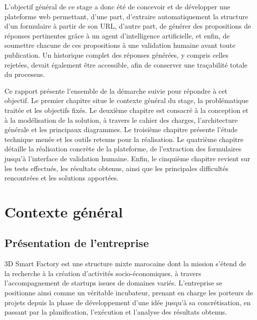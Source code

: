 \documentclass[12pt,a4paper]{report}
\begin{document}
L'objectif général de ce stage a donc été de concevoir et de développer une
plateforme web permettant, d'une part, d'extraire automatiquement la
structure d'un formulaire à partir de son URL, d'autre part, de générer des
propositions de réponses pertinentes grâce à un agent d'intelligence
artificielle, et enfin, de soumettre chacune de ces propositions à une
validation humaine avant toute publication. Un historique complet des
réponses générées, y compris celles rejetées, devait également être
accessible, afin de conserver une traçabilité totale du processus.

Ce rapport présente l'ensemble de la démarche suivie pour répondre à cet
objectif. Le premier chapitre situe le contexte général du stage, la
problématique traitée et les objectifs fixés. Le deuxième chapitre est
consacré à la conception et à la modélisation de la solution, à travers le
cahier des charges, l'architecture générale et les principaux diagrammes.
Le troisième chapitre présente l'étude technique menée et les outils
retenus pour la réalisation. Le quatrième chapitre détaille la réalisation
concrète de la plateforme, de l'extraction des formulaires jusqu'à
l'interface de validation humaine. Enfin, le cinquième chapitre revient sur
les tests effectués, les résultats obtenus, ainsi que les principales
difficultés rencontrées et les solutions apportées.

\chapter{Contexte général}

\section{Présentation de l'entreprise}

3D Smart Factory est une structure mixte marocaine dont la mission
s'étend de la recherche à la création d'activités socio-économiques, à
travers l'accompagnement de startups issues de domaines variés. L'entreprise
se positionne ainsi comme un véritable incubateur, prenant en charge les
porteurs de projets depuis la phase de développement d'une idée jusqu'à sa
concrétisation, en passant par la planification, l'exécution et l'analyse
des résultats obtenus.
\end{document}
